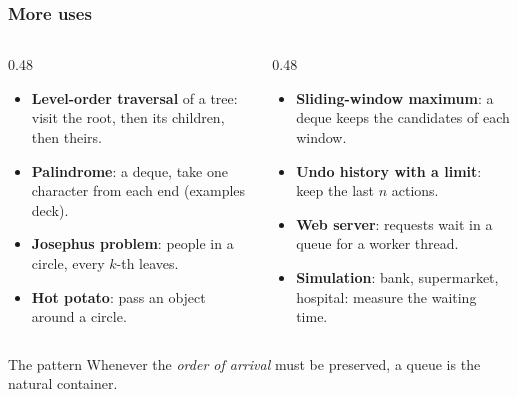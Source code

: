\documentclass[aspectratio=169,10pt,compress]{beamer}
\begin{document}
\begin{frame}[t,fragile] \frametitle{More uses}
  \begin{columns}[T]
    \begin{column}{0.48\textwidth}
      \begin{itemize}
        \item \textbf{Level-order traversal} of a tree: visit the root, then its children, then theirs.
        \item \textbf{Palindrome}: a deque, take one character from each end (examples deck).
        \item \textbf{Josephus problem}: people in a circle, every $k$-th leaves.
        \item \textbf{Hot potato}: pass an object around a circle.
      \end{itemize}
    \end{column}
    \begin{column}{0.48\textwidth}
      \begin{itemize}
        \item \textbf{Sliding-window maximum}: a deque keeps the candidates of each window.
        \item \textbf{Undo history with a limit}: keep the last $n$ actions.
        \item \textbf{Web server}: requests wait in a queue for a worker thread.
        \item \textbf{Simulation}: bank, supermarket, hospital: measure the waiting time.
      \end{itemize}
    \end{column}
  \end{columns}
  \vspace{0.6em}
  \begin{block}{The pattern}
    \small Whenever the \emph{order of arrival} must be preserved, a queue is the natural container.
  \end{block}
\end{frame}

\end{document}
